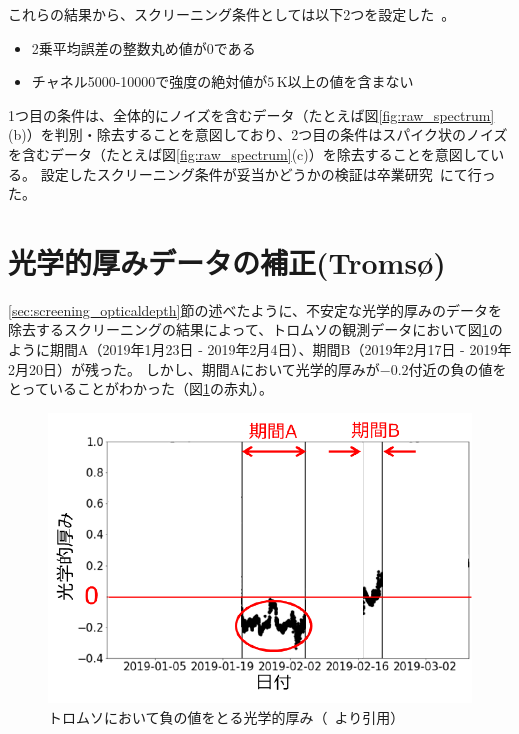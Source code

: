 これらの結果から、スクリーニング条件としては以下2つを設定した~\cite{goto2021bachelor}。
\begin{itemize}
    \item 2乗平均誤差の整数丸め値が0である
    \item チャネル5000-10000で強度の絶対値が$5\, \mathrm{K}$以上の値を含まない
\end{itemize}
1つ目の条件は、全体的にノイズを含むデータ（たとえば図\ref{fig:raw_spectrum}(b)）を判別・除去することを意図しており、2つ目の条件はスパイク状のノイズを含むデータ（たとえば図\ref{fig:raw_spectrum}(c)）を除去することを意図している。
設定したスクリーニング条件が妥当かどうかの検証は卒業研究~\cite{goto2021bachelor}にて行った。

\section{光学的厚みデータの補正(Troms\o)}
\label{sec:correction_opticaldepth}
\ref{sec:screening_opticaldepth}節の述べたように、不安定な光学的厚みのデータを除去するスクリーニングの結果によって、トロムソの観測データにおいて図\ref{fig:optical_depth_minus}のように期間A（2019年1月23日 - 2019年2月4日）、期間B（2019年2月17日 - 2019年2月20日）が残った。
しかし、期間Aにおいて光学的厚みが$-0.2$付近の負の値をとっていることがわかった（図\ref{fig:optical_depth_minus}の赤丸）。
\begin{figure}[htbp]
    \centering
    \includegraphics[width=\linewidth]{master_thesis_contents/master_thesis_fig/optical_depth_minus.pdf}
    \caption{トロムソにおいて負の値をとる光学的厚み（~\cite{goto2021bachelor}より引用）}
    \label{fig:optical_depth_minus}
\end{figure}

